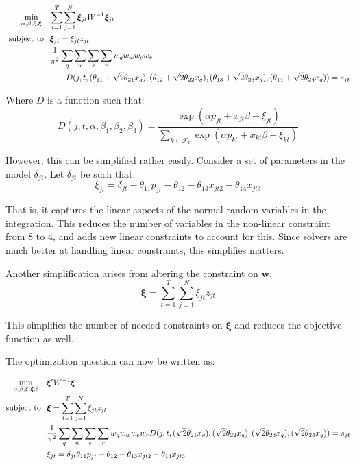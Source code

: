 \documentclass[12pt]{paper}
\begin{document}
\begin{align*}
  \min_{\alpha,\beta,\xi,\bm{\xi}} \quad & \sum_{t=1}^T \sum_{j=1}^N \bm{\xi}_{jt} {W}^{-1} \bm{\xi}_{jt}\\
  \text{ subject to: } & \bm{\xi}_{jt} = \xi_{jt} z_{jt}\\
                        & \frac{1}{\pi^2} \sum_q \sum_w \sum_e \sum_r w_q w_w w_e w_r\\
  & \quad \quad D( j, t, (\theta_{11} +
    \sqrt{2}\theta_{21}x_q),(\theta_{12} + \sqrt{2}\theta_{22}x_q),(\theta_{13} +
    \sqrt{2}\theta_{23}x_q),(\theta_{14} + \sqrt{2}\theta_{24}x_q)) = s_{jt}
\end{align*}

Where $D$ is a function such that: 
\begin{equation*}
  D( j, t, \alpha, \beta_1, \beta_2, \beta_3) =  \frac{\exp(\alpha
    p_{jt} + x_{jt} \beta + \xi_{jt})}{\sum_{k \in
      \mathcal{F}_t} \exp(\alpha p_{kt} + x_{kt}\beta + \xi_{kt})}
\end{equation*}

However, this can be simplified rather easily. Consider a set of
parameters in the model $\delta_{jt}$. Let $\delta_{jt}$ be such that:
\begin{equation*}
  \xi_{jt} = \delta_{jt}  - \theta_{11} p_{jt} - \theta_{12} - \theta_{13} x_{jt2} - \theta_{14} x_{jt3}
\end{equation*}

That is, it captures the linear aspects of the normal random variables
in the integration. This reduces the number of variables in the
non-linear constraint from $8$ to $4$, and adds new linear constraints
to account for this. Since solvers are much better at handling linear
constraints, this simplifies matters.

Another simplification arises from altering the constraint on $\bm{w}$.
\begin{equation*}
  \bm{\xi} = \sum_{t=1}^T \sum_{j=1}^N \xi_{jt} z_{jt}
\end{equation*}

This simplifies the number of needed constraints on $\bm{\xi}$ and
reduces the objective function as well.


The optimization question can
now be written as:

\begin{align*}
  \min_{\alpha,\beta,\xi,\bm{\xi},\delta} \quad & \bm{\xi}' {W}^{-1} \bm{\xi}\\
  \text{subject to: } & \bm{\xi} = \sum_{t=1}^T \sum_{j=1}^N \xi_{jt} z_{jt}\\
  & \frac{1}{\pi^2} \sum_q \sum_w \sum_e \sum_r w_q w_w w_e w_r D( j, t, (
    \sqrt{2}\theta_{21}x_q),(\sqrt{2}\theta_{22}x_q),(\sqrt{2}\theta_{23}x_q),(\sqrt{2}\theta_{24}x_q))
    = s_{jt}\\
  & \xi_{jt} = \delta_{jt} \theta_{11} p_{jt} - \theta_{12} - \theta_{13} x_{jt2} - \theta_{14} x_{jt3}
\end{align*}
\end{document}

